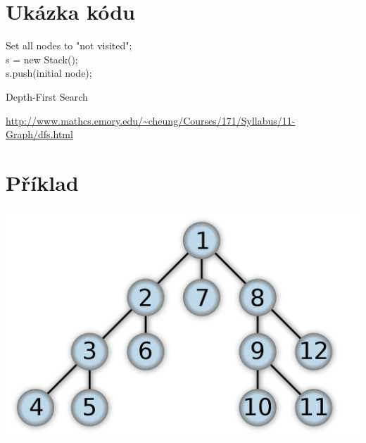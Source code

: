 \documentclass[10pt, hyperref={unicode}]{beamer}
\begin{document}
\section{Ukázka kódu}
\begin{frame}
	\begin{algorithm}[H]
	Set all nodes to "not visited"; \\
	s = new Stack(); \\
	s.push(initial node); \\
	\caption{Depth-First Search}
	\end{algorithm}
	\url{http://www.mathcs.emory.edu/~cheung/Courses/171/Syllabus/11-Graph/dfs.html}
\end{frame}

\section{Příklad}
\begin{frame}
	\includegraphics[scale=0.25]{img/dfs_tree.png}
\end{frame}
\end{document}
